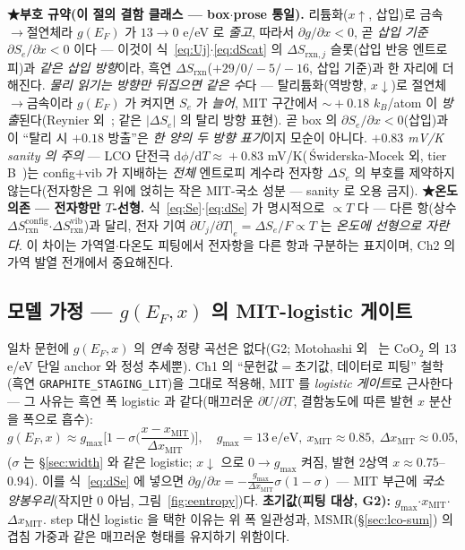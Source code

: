\documentclass[11pt,a4paper]{article}
\newcommand{\dd}{\mathrm{d}}
\newcommand{\rxn}{\mathrm{rxn}}
\newcommand{\code}[1]{\texttt{#1}}
\begin{document}
\textbf{★부호 규약(이 절의 결함 클래스 — box$\cdot$prose 통일).} 리튬화($x\!\uparrow$, 삽입)로 금속$\to$절연체라
$g(E_F)$ 가 $13\!\to\!0$ e/eV 로 \emph{줄고}, 따라서 $\partial g/\partial x<0$, 곧 \emph{삽입 기준 $\partial S_e/\partial x<0$}
이다 — 이것이 식~\eqref{eq:Uj}$\cdot$\eqref{eq:dScat} 의 $\Delta S_{\rxn,j}$ 슬롯(삽입 반응 엔트로피)과 \emph{같은 삽입
방향}이라, 흑연 $\Delta S_\rxn$($+29/0/-5/-16$, 삽입 기준)과 한 자리에 더해진다. \emph{물리 읽기는 방향만 뒤집으면 같은 수}다 —
탈리튬화(역방향, $x\!\downarrow$)로 절연체$\to$금속이라 $g(E_F)$ 가 켜지면 $S_e$ 가 \emph{늘어}, MIT 구간에서 $\sim\!+0.18$
$k_B$/atom 이 \emph{방출}된다(Reynier 외~\cite{reynier2004}; 같은 $|\Delta S_e|$ 의 탈리 방향 표현). 곧 box 의 $\partial S_e/\partial x<0$(삽입)과
이 ``탈리 시 $+0.18$ 방출''은 \emph{한 양의 두 방향 표기}이지 모순이 아니다. \emph{$+0.83$ mV/K sanity 의 주의} —
LCO 단전극 $\dd\phi/\dd T\!\approx\!+0.83$ mV/K(\,{\'S}widerska-Mocek 외, tier B~\cite{swiderska2019})는 config$+$vib 가 지배하는 \emph{전체} 엔트로피 계수라
전자항 $\Delta S_e$ 의 부호를 제약하지 않는다(전자항은 그 위에 얹히는 작은 MIT-국소 성분 — sanity 로 오용 금지).
\textbf{★온도 의존 — 전자항만 $T$-선형.} 식~\eqref{eq:Se}$\cdot$\eqref{eq:dSe} 가 명시적으로
$\propto T$ 다 — 다른 항(상수 $\Delta S_\rxn^\mathrm{config}$$\cdot$$\Delta S_\rxn^\mathrm{vib}$)과 달리, 전자 기여
$\partial U_j/\partial T|_e=\Delta S_e/F\propto T$ 는 \emph{온도에 선형으로 자란다}. 이 차이는 가역열$\cdot$다온도
피팅에서 전자항을 다른 항과 구분하는 표지이며, Ch2 의 가역 발열 전개에서 중요해진다.

\subsection{모델 가정 — $g(E_F,x)$ 의 MIT-logistic 게이트}
일차 문헌에 $g(E_F,x)$ 의 \emph{연속} 정량 곡선은 없다(G2; Motohashi 외~\cite{motohashi2009} 는 CoO$_2$ 의 $13$ e/eV 단일 anchor 와 정성
추세뿐). Ch1 의 ``문헌값$=$초기값, 데이터로 피팅'' 철학(흑연 \code{GRAPHITE\_STAGING\_LIT})을 그대로 적용해, MIT 를
\emph{logistic 게이트}로 근사한다 — 그 사유는 흑연 폭 logistic 과 같다(매끄러운 $\partial U/\partial T$, 결함농도에
따른 발현 $x$ 분산을 폭으로 흡수):
\begin{equation}
g(E_F,x)\approx g_{\max}\Big[1-\sigma\!\Big(\frac{x-x_\mathrm{MIT}}{\Delta x_\mathrm{MIT}}\Big)\Big],
\quad g_{\max}=13\ \text{e/eV},\ x_\mathrm{MIT}\approx0.85,\ \Delta x_\mathrm{MIT}\approx0.05,
\label{eq:gate}
\end{equation}
($\sigma$ 는 \S\ref{sec:width} 와 같은 logistic; $x\!\downarrow$ 으로 $0\!\to\!g_{\max}$ 켜짐, 발현 2상역
$x\approx0.75$--$0.94$). 이를 식~\eqref{eq:dSe} 에 넣으면 $\partial g/\partial x=-\frac{g_{\max}}{\Delta x_\mathrm{MIT}}
\sigma(1-\sigma)$ — MIT 부근에 \emph{국소 양봉우리}(작지만 0 아님, 그림~\ref{fig:eentropy})다. \textbf{초기값(피팅 대상,
G2):} $g_{\max}$$\cdot$$x_\mathrm{MIT}$$\cdot$$\Delta x_\mathrm{MIT}$. step 대신 logistic 을 택한 이유는 위 폭 일관성과,
MSMR(\S\ref{sec:lco-sum}) 의 겹침 가중과 같은 매끄러운 형태를 유지하기 위함이다.
\end{document}
